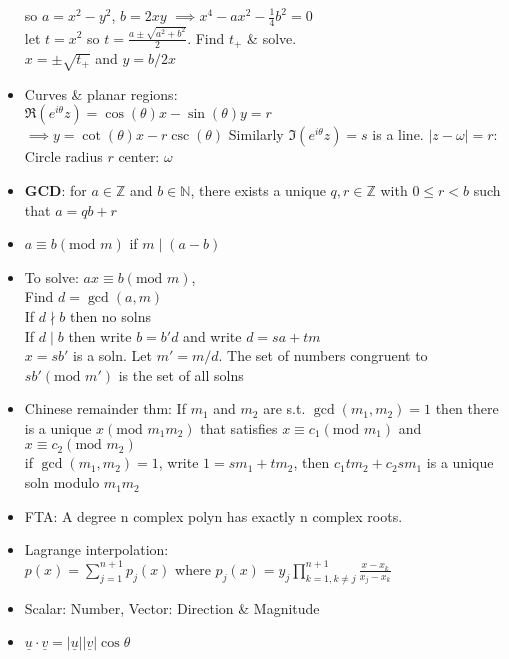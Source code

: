 \documentclass[10pt]{article}
\begin{document}
\begin{multicols}{2}
\begin{itemize}
    so $a=x^{2}-y^{2}$, $b=2xy$ $\implies x^{4}-ax^{2}-\frac{1}{4}b^{2}=0$\\
    let $t=x^{2}$ so $t=\frac{a\pm\sqrt{a^{2}+b^{2}}}{2}$. Find $t_{+}$ \& solve.\\
    $x=\pm\sqrt{t_{+}}$ and $y=b/2x$
    \item Curves \& planar regions:\\
    $\Re(e^{i\theta}z)=\cos(\theta)x-\sin(\theta)y=r$\\
    $\implies y=\cot(\theta)x-r\csc(\theta)$
    Similarly $\Im(e^{i\theta}z)=s$ is a line.
    $|z-\omega|=r$: Circle radius $r$ center: $\omega$
    \item \textbf{GCD}: for $a\in\mathbb{Z}$ and $b\in\mathbb{N}$, there exists a unique $q,r\in\mathbb{Z}$ with $0\leq r<b$ such that $a=qb+r$
    \item $a\equiv b(\text{mod }m)$ if $m\mid(a-b)$
    \item To solve: $ax\equiv b(\text{mod }m)$,\\
    Find $d=\gcd(a,m)$\\
    If $d\nmid b$ then no solns\\
    If $d\mid b$ then write $b=b'd$ and write $d=sa+tm$\\
    $x=sb'$ is a soln.
    Let $m'=m/d$. The set of numbers congruent to $sb'(\text{mod }m')$ is the set of all solns
    \item Chinese remainder thm: If $m_{1}$ and $m_{2}$ are s.t. $\gcd(m_{1},m_{2})=1$ then there is a unique $x(\text{mod }m_{1}m_{2})$ that satisfies $x\equiv c_{1}(\text{mod }m_{1})$ and $x\equiv c_{2}(\text{mod }m_{2})$\\
    if $\gcd(m_{1},m_{2})=1$, write $1=sm_{1}+tm_{2}$, then $c_{1}tm_{2}+c_{2}sm_{1}$ is a unique soln modulo $m_{1}m_{2}$
    \item FTA: A degree n complex polyn has exactly n complex roots.
    \item Lagrange interpolation:\\
    $p(x)=\sum^{n+1}_{j=1}p_{j}(x)$ where $p_{j}(x)=y_{j}\prod^{n+1}_{k=1,k\neq j}\frac{x-x_{k}}{x_{j}-x_{k}}$
    \item Scalar: Number, Vector: Direction \& Magnitude
    \item $\underline{u}\cdot\underline{v}=|\underline{u}||\underline{v}|\cos{\theta}$

\end{itemize}
\end{multicols}
\end{document}
